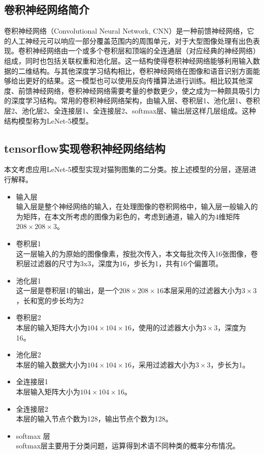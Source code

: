 \documentclass[a4paper,11pt]{ctexart}
\theoremstyle{break}
\theoremstyle{plain}
\begin{document}
\subsection{卷积神经网络简介}
卷积神经网络（Convolutional Neural Network, CNN）是一种前馈神经网络，它的人工神经元可以响应一部分覆盖范围内的周围单元，对于大型图像处理有出色表现。卷积神经网络由一个或多个卷积层和顶端的全连通层（对应经典的神经网络）组成，同时也包括关联权重和池化层。这一结构使得卷积神经网络能够利用输入数据的二维结构。与其他深度学习结构相比，卷积神经网络在图像和语音识别方面能够给出更好的结果。这一模型也可以使用反向传播算法进行训练。相比较其他深度、前馈神经网络，卷积神经网络需要考量的参数更少，使之成为一种颇具吸引力的深度学习结构。常用的卷积神经网络架构，由输入层、卷积层1、池化层1、卷积层2、池化层2、全连接层1、全连接层2、softmax层、输出层这样几层组成。这种结构模型称为LeNet-5模型。
\subsection{tensorflow实现卷积神经网络结构}
本文考虑应用LeNet-5模型实现对猫狗图集的二分类。按上述模型的分层，逐层进行解释。
\begin{itemize}
	\item 输入层\\
	输入层是整个神经网络的输入，在处理图像的卷积网格中，输入层一般输入的为矩阵，在本文所考虑的图像为彩色的，考虑到通道，输入的为4维矩阵$208\times 208\times 3$。
	\item 卷积层1\\
	这一层输入的为原始的图像像素，按批次传入，本文每批次传入16张图像，卷积层过滤器的尺寸为3x3，深度为16，步长为1，共有16个偏置项。
	\item 池化层1\\
	这一层是卷积层1的输出，是一个$208\times 208\times16$本层采用的过滤器大小为$3\times3$，长和宽的步长均为2
	\item 卷积层2\\
	本层的输入矩阵大小为$104\times104\times 16$，使用的过滤器大小为$3\times 3$，深度为16。
	\item 池化层2\\
	本层的输入数据大小为$104\times 104\times 16$，采用过滤器大小为$3\times 3$，步长为1。
	\item 全连接层1\\
	本层输入矩阵大小为$104\times 104\times 16$。
	\item 全连接层2\\
	本层的输入节点个数为128，输出节点个数为128。
	\item softmax 层\\
	softmax层主要用于分类问题，运算得到术语不同种类的概率分布情况。
\end{itemize}
\end{document}
